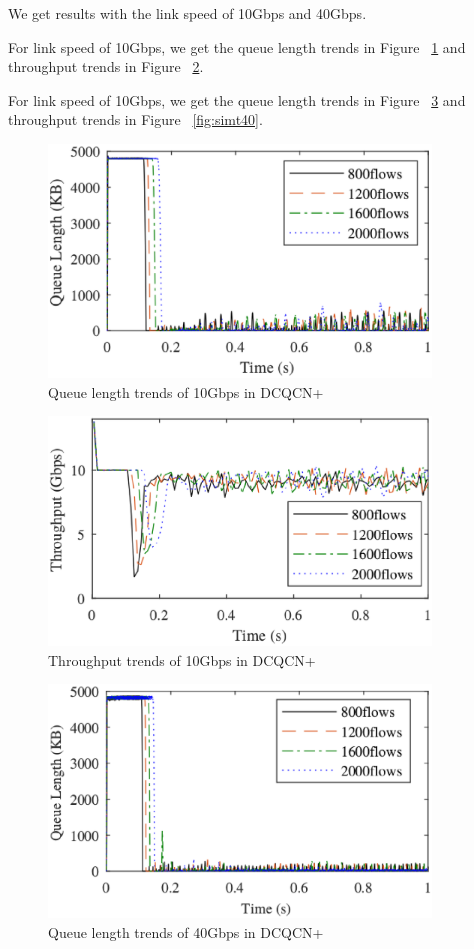 \documentclass[12pt,a4paper]{article}
\begin{document}
We get results with the link speed of 10Gbps and 40Gbps.

For link speed of 10Gbps, we get the queue length trends in Figure ~\ref{fig:simq10}
and throughput trends in Figure ~\ref{fig:simt10}.

For link speed of 10Gbps, we get the queue length trends in Figure ~\ref{fig:simq40}
and throughput trends in Figure ~\ref{fig:simt40}.

\begin{figure}[h!]
	\begin{center}
		\includegraphics[width=4in]{simq10}
		\caption{Queue length trends of 10Gbps in DCQCN+}
		\label{fig:simq10}
	\end{center}
\end{figure}

\begin{figure}[h!]
	\begin{center}
		\includegraphics[width=4in]{simt10}
		\caption{Throughput trends of 10Gbps in DCQCN+}
		\label{fig:simt10}
	\end{center}
\end{figure}

\begin{figure}[h!]
	\begin{center}
		\includegraphics[width=4in]{simq40}
		\caption{Queue length trends of 40Gbps in DCQCN+}
		\label{fig:simq40}
	\end{center}
\end{figure}
\end{document}
